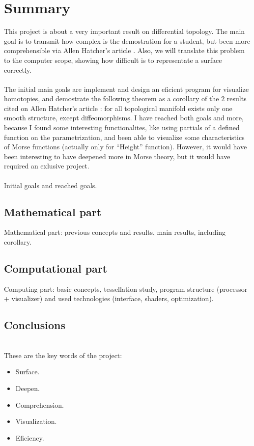 %

\chapter{Summary}
This project is about a very important result on differential topology. The main goal is to transmit how complex is the demostration for a student, but been more comprehensible via Allen Hatcher's article \cite{arXiv:1312.3518}. Also, we will translate this problem to the computer scope, showing how difficult is to representate a surface correctly.\\
\\The initial main goals are implement and design an eficient program for visualize homotopies, and demostrate the following theorem as a corollary of the $2$ results cited on Allen Hatcher's article \cite{arXiv:1312.3518}: for all topological manifold exists only one smooth structure, except diffeomorphisms. I have reached both goals and more, because I found some interesting functionalites, like using partials of a defined function on the parametrization, and been able to visualize some characteristics of Morse functions (actually only for ``Height'' function). However, it would have been interesting to have deepened more in Morse theory, but it would have required an exlusive project.\\
\\Initial goals and reached goals.

\section*{Mathematical part}
Mathematical part: previous concepts and results, main results, including corollary.

\section*{Computational part}
Computing part: basic concepts, tessellation study, program structure (processor + visualizer) and used technologies (interface, shaders, optimization).\\

\section*{Conclusions}

\\These are the key words of the project:
\begin{itemize}
	\item Surface.
	\item Deepen.
	\item Comprehension.
	\item Visualization.
	\item Eficiency.
\end{itemize}

\endinput
